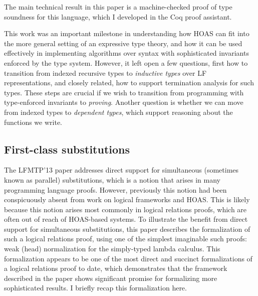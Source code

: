 \documentclass{article}
\begin{document}
The main technical result in this paper is a machine-checked proof of type
soundness for this language, which I developed in the Coq proof assistant.

This work was an important milestone in understanding how HOAS can fit
into the more general setting of an expressive type theory, and how it
can be used effectively in implementing algorithms over syntax with
sophisticated invariants enforced by the type system. However, it left open a few
questions, first how to transition from indexed recursive types to
\emph{inductive types} over LF representations, and closely related, how to support termination analysis for
such types. These steps are crucial if we wish to transition from
programming with type-enforced invariants to \emph{proving}. Another question is whether we can move
from indexed types to \emph{dependent types}, which support reasoning
about the functions we write.

\subsection{First-class substitutions}\label{sec:lfmtp13}
The LFMTP'13 paper \citep{Cave13} addresses direct support for
simultaneous (sometimes known as parallel)
substitutions, which is a notion that arises in many programming
language proofs. However, previously this notion had been
conspicuously absent from work on logical frameworks and HOAS. This is
likely because this notion arises most commonly in logical relations
proofs, which are often out of reach of HOAS-based systems. To
illustrate the benefit from direct support for
simultaneous substitutions, this paper describes the formalization of such
a logical relations proof, using one of the simplest
imaginable such proofs: weak (head) normalization for the
simply-typed lambda calculus. This formalization appears to be one of
the most direct and succinct formalizations of a logical relations
proof to date, which demonstrates that the framework described in the
paper shows significant promise for formalizing more sophisticated results. I briefly recap
this formalization here. 


\end{document}
